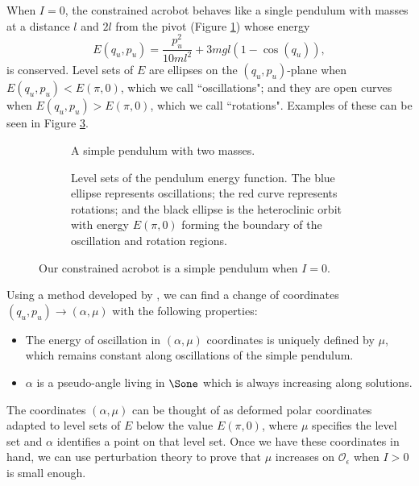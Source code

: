 When \(I = 0\), the constrained acrobot behaves like a single
pendulum with masses at a distance \(l\) and \(2l\) from the pivot 
(Figure \ref{fig:acrobot-I0}) whose energy
\begin{equation}\label{eqn:acrobot-nominal-E}
    E(q_u,p_u) = \frac{p_u^2}{10ml^2} + 3mgl(1 - \cos(q_u))
    ,
\end{equation}
is conserved.
Level sets of \(E\) are ellipses on the \((q_u,p_u)\)-plane
when \(E(q_u,p_u) < E(\pi,0)\), which we call ``oscillations";
and they are open curves when \(E(q_u,p_u) > E(\pi,0)\), which we call
``rotations". 
Examples of these can be seen in Figure \ref{fig:pendulum-level-sets}.

\begin{figure}
    \centering
    \begin{subfigure}[t]{0.45\textwidth}
        \caption{A simple pendulum with two masses.}
        \label{fig:acrobot-I0}
    \end{subfigure}
    \hfill
    \begin{subfigure}[t]{0.45\textwidth}
        \caption{Level sets of the pendulum energy function.
            The blue ellipse represents oscillations; the red curve
            represents rotations; and the black ellipse is the heteroclinic
            orbit with energy \(E(\pi,0)\) forming the boundary of the
            oscillation and rotation regions.}
        \label{fig:pendulum-level-sets}
    \end{subfigure}
    \caption{Our constrained acrobot is a simple pendulum when \(I = 0\).}
\end{figure}

Using a method developed by \citet{dynamic_vhcs_stabilize_closed_orbits},
we can find a change of coordinates \((q_u,p_u) \to (\alpha, \mu)\) with the
following properties:
\begin{itemize}
    \item The energy of oscillation in \((\alpha,\mu)\) coordinates is 
        uniquely defined by \(\mu\), which remains constant along oscillations
        of the simple pendulum.
    \item \(\alpha\) is a pseudo-angle living in \(\Sone\) which is
        always increasing along solutions.
\end{itemize}
The coordinates \((\alpha,\mu)\) can be thought of as deformed polar coordinates
adapted to level sets of \(E\) below the value \(E(\pi,0)\), 
where \(\mu\) specifies the level set and \(\alpha\) identifies a point on that
level set.
Once we have these coordinates in hand, we can use perturbation theory to prove
that \(\mu\) increases on \(\mathcal{O}_\epsilon\) when \(I > 0\) is small enough.

